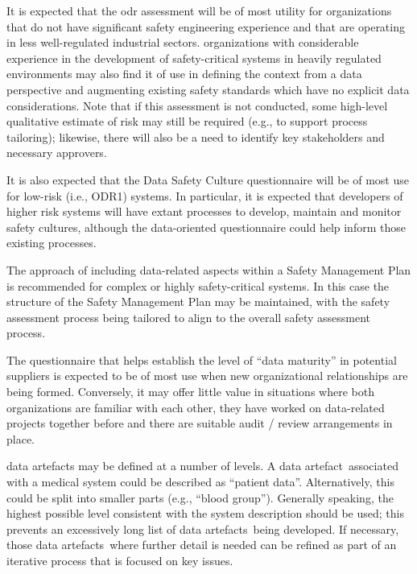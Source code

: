 It is expected that the \gls{odr} assessment will be of most utility for organizations that do not have significant safety engineering experience and that are operating in less well-regulated industrial sectors.
organizations with considerable experience in the development of safety-critical systems in heavily regulated environments
may also find it of use in defining the context from a data perspective and augmenting existing safety standards which have no explicit data considerations.
Note that if this assessment is not conducted, some high-level qualitative estimate of risk may still be required (e.g., to support process tailoring); likewise, there will also be a need to identify key \glspl{stakeholder} and necessary approvers.

It is also expected that the Data Safety Culture questionnaire will be of most use for low-risk (i.e., ODR1) systems. In particular, it is expected that developers of higher risk systems will have extant processes to develop, maintain and monitor safety cultures,
although the data-oriented questionnaire could help inform those existing processes.

The approach of including data-related aspects within a Safety Management Plan is recommended for complex or highly safety-critical systems. In this case the structure of the Safety Management Plan may be maintained, with the \gls{safety assessment} process being tailored to align to the overall safety assessment process.

The questionnaire that helps establish the level of ``data maturity'' in potential suppliers is expected to be of most use when new organizational relationships are being formed. Conversely, it may offer little value in situations where both organizations are familiar with each other, they have worked on data-related projects together before and there are suitable audit / review arrangements in place.

\Glspl{data artefact} may be defined at a number of levels. \cbstart A \gls{data artefact}\cbend\ associated with a medical system could be described as ``patient data''. Alternatively, this could be split into smaller parts (e.g., ``blood group''). Generally speaking, the highest possible level consistent with the system description should be used; this prevents an excessively long list of \cbstart\glspl{data artefact}\cbend\ being developed. If necessary, those \cbstart\glspl{data artefact}\cbend\ where further detail is needed can be refined as part of an iterative process that is focused on key issues.

